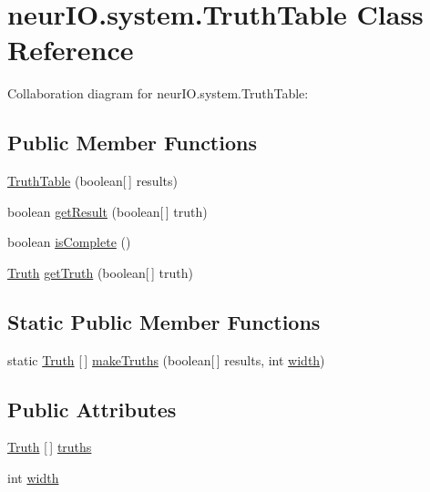 \hypertarget{classneur_i_o_1_1system_1_1_truth_table}{}\section{neur\+I\+O.\+system.\+Truth\+Table Class Reference}
\label{classneur_i_o_1_1system_1_1_truth_table}


Collaboration diagram for neur\+I\+O.\+system.\+Truth\+Table\+:
\subsection*{Public Member Functions}
\begin{DoxyCompactItemize}
\item 
\hyperlink{classneur_i_o_1_1system_1_1_truth_table_a9a4e5d68d6f275a51c7af28c5e4f11c2}{Truth\+Table} (boolean\mbox{[}$\,$\mbox{]} results)
\item 
boolean \hyperlink{classneur_i_o_1_1system_1_1_truth_table_a47bb5f7ba445758e1b892e079c501212}{get\+Result} (boolean\mbox{[}$\,$\mbox{]} truth)
\item 
boolean \hyperlink{classneur_i_o_1_1system_1_1_truth_table_a0932bf77d2e3e05e0a317f8003e67e53}{is\+Complete} ()
\item 
\hyperlink{classneur_i_o_1_1system_1_1_truth}{Truth} \hyperlink{classneur_i_o_1_1system_1_1_truth_table_a855f811de0244489c48772a0511b48ce}{get\+Truth} (boolean\mbox{[}$\,$\mbox{]} truth)
\end{DoxyCompactItemize}
\subsection*{Static Public Member Functions}
\begin{DoxyCompactItemize}
\item 
static \hyperlink{classneur_i_o_1_1system_1_1_truth}{Truth} \mbox{[}$\,$\mbox{]} \hyperlink{classneur_i_o_1_1system_1_1_truth_table_a1146ea2f3e41f379b920947a2ad840d8}{make\+Truths} (boolean\mbox{[}$\,$\mbox{]} results, int \hyperlink{classneur_i_o_1_1system_1_1_truth_table_a71a416200e01a326bad83c9509cca9f1}{width})
\end{DoxyCompactItemize}
\subsection*{Public Attributes}
\begin{DoxyCompactItemize}
\item 
\hyperlink{classneur_i_o_1_1system_1_1_truth}{Truth} \mbox{[}$\,$\mbox{]} \hyperlink{classneur_i_o_1_1system_1_1_truth_table_aa8cdabf1eb334fc405d50b9249e42ae4}{truths}
\item 
int \hyperlink{classneur_i_o_1_1system_1_1_truth_table_a71a416200e01a326bad83c9509cca9f1}{width}
\end{DoxyCompactItemize}


